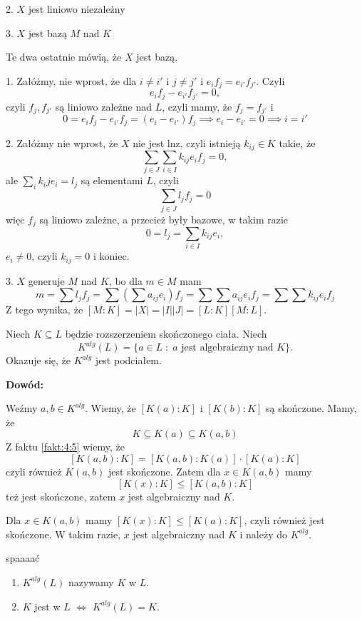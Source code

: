 2. $X$ jest liniowo niezależny

3. $X$ jest bazą $M$ nad $K$

Te dwa ostatnie mówią, że $X$ jest bazą.

1. Załóżmy, nie wprost, że dla $i\neq i'$ i $j\neq j'$ i $e_if_j=e_{i'}f_{j'}$. Czyli
$$e_if_j-e_{i'}f_{j'}=0,$$
czyli $f_j,f_{j'}$ są liniowo zależne nad $L$, czyli mamy, że $f_j=f_{j'}$ i
$$0=e_if_j-e_{i'}f_{j}=(e_i-e_{i'})f_j\implies e_i-e_{i'}=0\implies i=i'$$

2. Załóżmy nie wprost, że $X$ nie jest lnz, czyli istnieją $k_{ij}\in K$ takie, że
$$\sum\limits_{j\in J}\sum\limits_{i\in I}k_{ij}e_if_j=0,$$
ale $\sum\limits_ik_ije_i=l_j$ są elementami $L$, czyli
$$\sum\limits_{j\in J}l_jf_j=0$$
więc $f_j$ są liniowo zależne, a przecież były bazowe, w takim razie
$$0=l_j=\sum\limits_{i\in I}k_{ij}e_i,$$
$e_i\neq0$, czyli $k_{ij}=0$ i koniec.

3. $X$ generuje $M$ nad $K$, bo dla $m\in M$ mam
$$m=\sum l_jf_j=\sum\left(\sum a_{ij}e_i\right)f_j=\sum\sum a_{ij}e_if_j=\sum \sum k_{ij}e_if_j$$
Z tego wynika, że $[M:K]=|X|=|I||J|=[L:K][M:L]$.

\begin{wniosek}
    Niech $K\subseteq L$ będzie rozszerzeniem skończonego ciała. Niech 
    $$K^{alg}(L)=\{a\in L\;:\;a\text{ jest algebraiczny nad }K\}.$$
    Okazuje się, że $K^{alg}$ jest podciałem.
\end{wniosek}

\textbf{Dowód:}

Weźmy $a,b\in K^{alg}$. Wiemy, że $[K(a):K]$ i $[K(b):K]$ są skończone. Mamy, że
$$K\subseteq K(a)\subseteq K(a, b)$$
Z faktu \ref{fakt:4:5} wiemy, że 
$$[K(a, b):K]=[K(a,b):K(a)]\cdot[K(a):K]$$
czyli również $K(a,b)$ jest skończone. Zatem dla $x\in K(a,b)$ mamy
$$[K(x):K]\leq[K(a,b):K]$$
też jest skończone, zatem $x$ jest algebraiczny nad $K$.
\medskip

Dla $x\in K(a, b)$ mamy $[K(x):K]\leq[K(a):K]$, czyli również jest skończone. W takim razie, $x$ jest algebraiczny nad $K$ i należy do $K^{alg}$.
\medskip

\begin{definicja}{\color{back}spaaaać}
    \begin{enumerate}
        \item $K^{alg}(L)$ nazywamy  $K$ w $L$.
        \item $K$ jest  w $L$ $\iff$ $K^{alg}(L)=K$.
    \end{enumerate}
\end{definicja}

